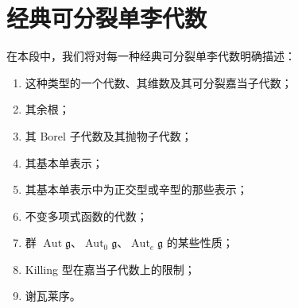 \section{经典可分裂单李代数}

在本段中，我们将对每一种经典可分裂单李代数明确描述：

\begin{enumerate}
\def\labelenumi{(\Roman{enumi})}
\item
  这种类型的一个代数、其维数及其可分裂嘉当子代数；
\item
  其余根；
\item
  其 Borel 子代数及其抛物子代数；
\item
  其基本单表示；
\item
  其基本单表示中为正交型或辛型的那些表示；
\item
  不变多项式函数的代数；
\item
  群 \(\operatorname{Aut} \mathfrak{g}\)、\(\operatorname{Aut}_0 \mathfrak{g}\)、\(\operatorname{Aut}_e \mathfrak{g}\) 的某些性质；
\item
  Killing 型在嘉当子代数上的限制；
\item
  谢瓦莱序。
\end{enumerate}

